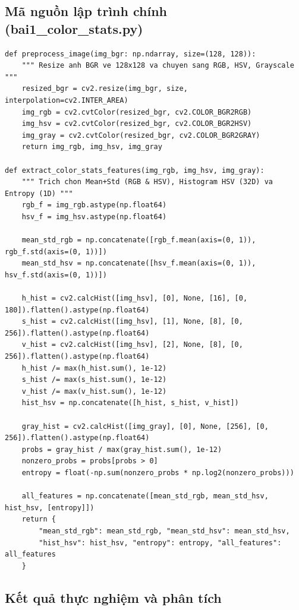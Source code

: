 \documentclass[12pt,a4paper]{article}
\begin{document}
\subsection{Mã nguồn lập trình chính (bai1\_color\_stats.py)}
\begin{lstlisting}
def preprocess_image(img_bgr: np.ndarray, size=(128, 128)):
    """ Resize anh BGR ve 128x128 va chuyen sang RGB, HSV, Grayscale """
    resized_bgr = cv2.resize(img_bgr, size, interpolation=cv2.INTER_AREA)
    img_rgb = cv2.cvtColor(resized_bgr, cv2.COLOR_BGR2RGB)
    img_hsv = cv2.cvtColor(resized_bgr, cv2.COLOR_BGR2HSV)
    img_gray = cv2.cvtColor(resized_bgr, cv2.COLOR_BGR2GRAY)
    return img_rgb, img_hsv, img_gray

def extract_color_stats_features(img_rgb, img_hsv, img_gray):
    """ Trich chon Mean+Std (RGB & HSV), Histogram HSV (32D) va Entropy (1D) """
    rgb_f = img_rgb.astype(np.float64)
    hsv_f = img_hsv.astype(np.float64)

    mean_std_rgb = np.concatenate([rgb_f.mean(axis=(0, 1)), rgb_f.std(axis=(0, 1))])
    mean_std_hsv = np.concatenate([hsv_f.mean(axis=(0, 1)), hsv_f.std(axis=(0, 1))])

    h_hist = cv2.calcHist([img_hsv], [0], None, [16], [0, 180]).flatten().astype(np.float64)
    s_hist = cv2.calcHist([img_hsv], [1], None, [8], [0, 256]).flatten().astype(np.float64)
    v_hist = cv2.calcHist([img_hsv], [2], None, [8], [0, 256]).flatten().astype(np.float64)
    h_hist /= max(h_hist.sum(), 1e-12)
    s_hist /= max(s_hist.sum(), 1e-12)
    v_hist /= max(v_hist.sum(), 1e-12)
    hist_hsv = np.concatenate([h_hist, s_hist, v_hist])

    gray_hist = cv2.calcHist([img_gray], [0], None, [256], [0, 256]).flatten().astype(np.float64)
    probs = gray_hist / max(gray_hist.sum(), 1e-12)
    nonzero_probs = probs[probs > 0]
    entropy = float(-np.sum(nonzero_probs * np.log2(nonzero_probs)))

    all_features = np.concatenate([mean_std_rgb, mean_std_hsv, hist_hsv, [entropy]])
    return {
        "mean_std_rgb": mean_std_rgb, "mean_std_hsv": mean_std_hsv,
        "hist_hsv": hist_hsv, "entropy": entropy, "all_features": all_features
    }
\end{lstlisting}

\subsection{Kết quả thực nghiệm và phân tích}
\end{document}
